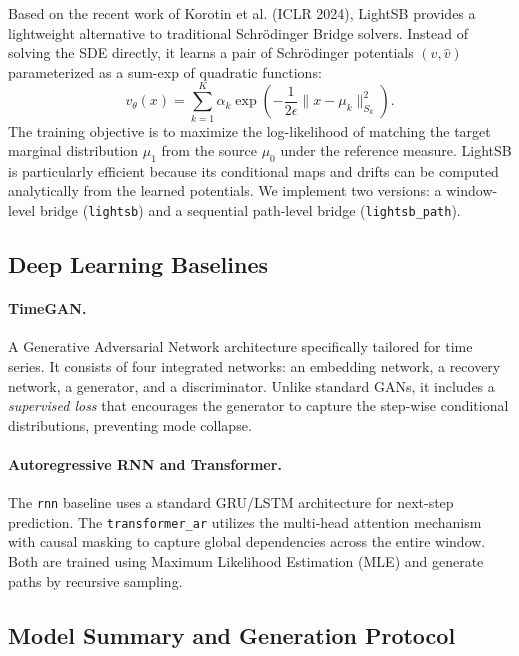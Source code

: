 \documentclass[11pt,a4paper]{article}
\begin{document}
Based on the recent work of Korotin et al. (ICLR 2024), LightSB provides a
lightweight alternative to traditional Schrödinger Bridge solvers. Instead of
solving the SDE directly, it learns a pair of Schrödinger potentials $(v, \widehat{v})$
parameterized as a sum-exp of quadratic functions:
\begin{equation}
    v_{\theta}(x) = \sum_{k=1}^K \alpha_k \exp\left( -\frac{1}{2\epsilon} \|x - \mu_k\|_{S_k}^2 \right).
\end{equation}
The training objective is to maximize the log-likelihood of matching the target
marginal distribution $\mu_1$ from the source $\mu_0$ under the reference
measure. LightSB is particularly efficient because its conditional maps and
drifts can be computed analytically from the learned potentials. We implement
two versions: a window-level bridge (\texttt{lightsb}) and a sequential
path-level bridge (\texttt{lightsb\_path}).

\subsection{Deep Learning Baselines}

\paragraph{TimeGAN.}
A Generative Adversarial Network architecture specifically tailored for time
series. It consists of four integrated networks: an embedding network, a
recovery network, a generator, and a discriminator. Unlike standard GANs, it
includes a \textit{supervised loss} that encourages the generator to capture the
step-wise conditional distributions, preventing mode collapse.

\paragraph{Autoregressive RNN and Transformer.}
The \texttt{rnn} baseline uses a standard GRU/LSTM architecture for next-step
prediction. The \texttt{transformer\_ar} utilizes the multi-head attention
mechanism with causal masking to capture global dependencies across the entire
window. Both are trained using Maximum Likelihood Estimation (MLE) and generate
paths by recursive sampling.

\subsection{Model Summary and Generation Protocol}
\end{document}
